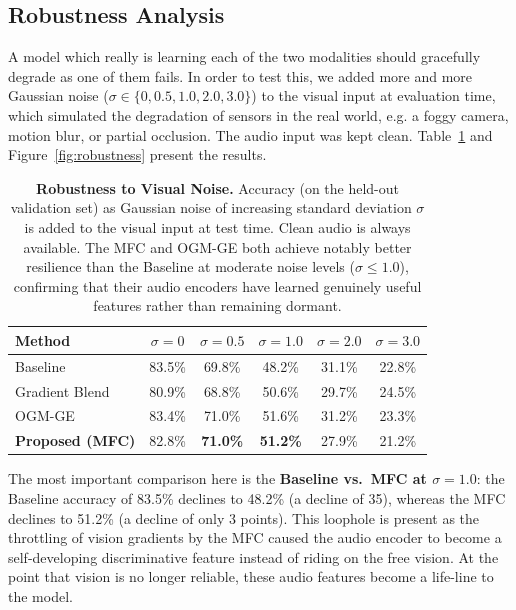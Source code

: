 \documentclass{ieeeaccess}
\begin{document}
\subsection{Robustness Analysis}

A model which really is learning each of the two modalities should gracefully degrade as one of them fails. In order to test this, we added more and more Gaussian noise ($\sigma \in \{0, 0.5, 1.0, 2.0, 3.0\}$) to the visual input at evaluation time, which simulated the degradation of sensors in the real world, e.g. a foggy camera, motion blur, or partial occlusion. The audio input was kept clean. Table~\ref{tab:robustness} and Figure~\ref{fig:robustness} present the results.

\begin{table}[h]
\caption{\textbf{Robustness to Visual Noise.} Accuracy (on the held-out validation set) as Gaussian noise of increasing standard deviation $\sigma$ is added to the visual input at test time. Clean audio is always available. The MFC and OGM-GE both achieve notably better resilience than the Baseline at moderate noise levels ($\sigma \leq 1.0$), confirming that their audio encoders have learned genuinely useful features rather than remaining dormant.}
\label{tab:robustness}
\centering
\begin{tabular}{@{}lccccc@{}}
\toprule
\textbf{Method} & \textbf{$\sigma{=}0$} & \textbf{$\sigma{=}0.5$} & \textbf{$\sigma{=}1.0$} & \textbf{$\sigma{=}2.0$} & \textbf{$\sigma{=}3.0$} \\ \midrule
Baseline                             & 83.5\% & 69.8\% & 48.2\% & 31.1\% & 22.8\% \\
Gradient Blend \cite{wang2020makes} & 80.9\% & 68.8\% & 50.6\% & 29.7\% & 24.5\% \\
OGM-GE \cite{peng2022balanced}                 & 83.4\% & 71.0\% & 51.6\% & 31.2\% & 23.3\% \\
\textbf{Proposed (MFC)}                  & 82.8\% & \textbf{71.0\%} & \textbf{51.2\%} & 27.9\% & 21.2\% \\
\bottomrule
\end{tabular}%

\end{table}

The most important comparison here is the \textbf{Baseline vs.\ MFC at $\sigma = 1.0$}: the Baseline accuracy of 83.5\% declines to 48.2\% (a decline of 35), whereas the MFC declines to 51.2\% (a decline of only 3 points). This loophole is present as the throttling of vision gradients by the MFC caused the audio encoder to become a self-developing discriminative feature instead of riding on the free vision. At the point that vision is no longer reliable, these audio features become a life-line to the model.
\end{document}
